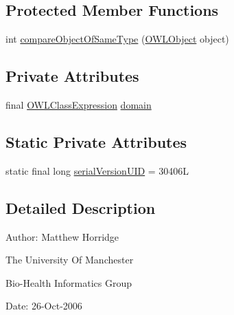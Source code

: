 \subsection*{Protected Member Functions}
\begin{DoxyCompactItemize}
\item 
int \hyperlink{classuk_1_1ac_1_1manchester_1_1cs_1_1owl_1_1owlapi_1_1_o_w_l_property_domain_axiom_impl_3_01_p_0da3f17a1850e78bb831621c892c6c34a_ab5cb86c9e5e72fc7c727a0c24c316106}{compare\-Object\-Of\-Same\-Type} (\hyperlink{interfaceorg_1_1semanticweb_1_1owlapi_1_1model_1_1_o_w_l_object}{O\-W\-L\-Object} object)
\end{DoxyCompactItemize}
\subsection*{Private Attributes}
\begin{DoxyCompactItemize}
\item 
final \hyperlink{interfaceorg_1_1semanticweb_1_1owlapi_1_1model_1_1_o_w_l_class_expression}{O\-W\-L\-Class\-Expression} \hyperlink{classuk_1_1ac_1_1manchester_1_1cs_1_1owl_1_1owlapi_1_1_o_w_l_property_domain_axiom_impl_3_01_p_0da3f17a1850e78bb831621c892c6c34a_ace410220929d89880e86d312bcce8c9f}{domain}
\end{DoxyCompactItemize}
\subsection*{Static Private Attributes}
\begin{DoxyCompactItemize}
\item 
static final long \hyperlink{classuk_1_1ac_1_1manchester_1_1cs_1_1owl_1_1owlapi_1_1_o_w_l_property_domain_axiom_impl_3_01_p_0da3f17a1850e78bb831621c892c6c34a_afb1ed41a72c2fb3a762562d6769bf94e}{serial\-Version\-U\-I\-D} = 30406\-L
\end{DoxyCompactItemize}


\subsection{Detailed Description}
Author\-: Matthew Horridge\par
 The University Of Manchester\par
 Bio-\/\-Health Informatics Group\par
 Date\-: 26-\/\-Oct-\/2006\par
\par
 

